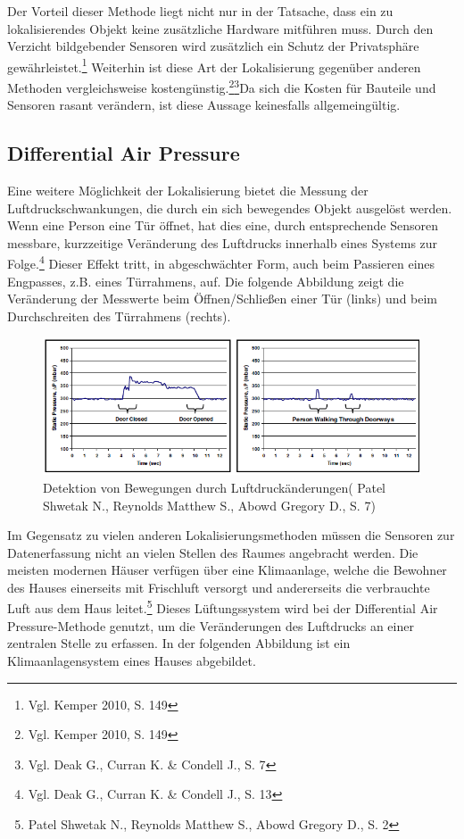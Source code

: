 Der Vorteil dieser Methode liegt nicht nur in der Tatsache, dass ein zu lokalisierendes Objekt keine zusätzliche Hardware mitführen muss. Durch den Verzicht bildgebender Sensoren wird zusätzlich ein Schutz der Privatsphäre gewährleistet.\footnote{Vgl. Kemper 2010, S. 149} Weiterhin ist diese Art der Lokalisierung gegenüber anderen Methoden vergleichsweise kostengünstig.\footnote{Vgl. Kemper 2010, S. 149}\footnote{Vgl. Deak G., Curran K. \& Condell J., S. 7}Da sich die Kosten für Bauteile und Sensoren rasant verändern, ist diese Aussage keinesfalls allgemeingültig. 

\subsection{Differential Air Pressure}
Eine weitere Möglichkeit der Lokalisierung bietet die Messung der Luftdruckschwankungen, die durch ein sich bewegendes Objekt ausgelöst werden. Wenn eine Person eine Tür öffnet, hat dies eine, durch entsprechende Sensoren messbare, kurzzeitige Veränderung des Luftdrucks innerhalb eines Systems zur Folge.\footnote{Vgl. Deak G., Curran K. \& Condell J., S. 13} Dieser Effekt tritt, in abgeschwächter Form, auch beim Passieren eines Engpasses, z.B. eines Türrahmens, auf. Die folgende Abbildung zeigt die Veränderung der Messwerte beim Öffnen/Schließen einer Tür (links) und beim Durchschreiten des Türrahmens (rechts).

\begin{figure}[H]
	\centering
	\includegraphics[width=1.0\textwidth]{pictures/dap_diagramm}
	\caption{Detektion von Bewegungen durch Luftdruckänderungen( Patel Shwetak N., Reynolds Matthew S., Abowd Gregory D., S. 7)}
\end{figure} 

Im Gegensatz zu vielen anderen Lokalisierungsmethoden müssen die Sensoren zur Datenerfassung nicht an vielen Stellen des Raumes angebracht werden. Die meisten modernen Häuser verfügen über eine Klimaanlage, welche die Bewohner des Hauses einerseits mit Frischluft versorgt und andererseits die verbrauchte Luft aus dem Haus leitet.\footnote{Patel Shwetak N., Reynolds Matthew S., Abowd Gregory D., S. 2} Dieses Lüftungssystem wird bei der Differential Air Pressure-Methode genutzt, um die Veränderungen des Luftdrucks an einer zentralen Stelle zu erfassen. In der folgenden Abbildung ist ein Klimaanlagensystem eines Hauses abgebildet. 

